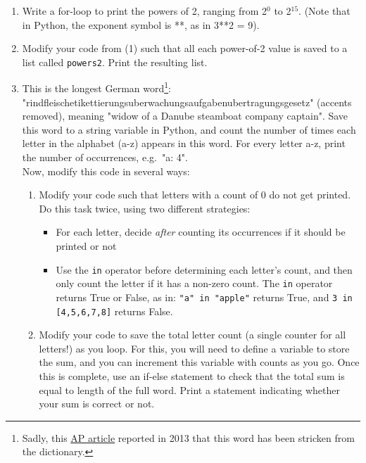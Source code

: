 \documentclass{article}[12pt]
\newcommand{\code}[1]{\texttt{#1}}  %
\begin{document}
\begin{enumerate}[itemsep=5ex]
	\item Write a for-loop to print the powers of 2, ranging from 2$^0$ to 2$^{15}$. (Note that in Python, the exponent symbol is **, as in 3**2 = 9). 
	
	\item Modify your code from (1) such that all each power-of-2 value is saved to a list called \code{powers2}. Print the resulting list. 

	
	\item This is the longest German word\footnote{Sadly, this \href{http://www.salon.com/2013/06/03/law_change_spells_end_for_germanys_longest_word_ap/}{AP article} reported in 2013 that this word has been stricken from the dictionary.}: "rindfleischetikettierungsuberwachungsaufgabenubertragungsgesetz" (accents removed), meaning "widow of a Danube steamboat company captain". Save this word to a string variable in Python, and count the number of times each letter in the alphabet (a-z) appears in this word. For every letter a-z, print the number of occurrences, e.g.\ "a: 4".
	\\ Now, modify this code in several ways:
	\begin{enumerate}[itemsep=2ex]
		\item Modify your code such that letters with a count of 0 do not get printed. Do this task twice, using two different strategies:
		\begin{itemize}
			\item For each letter, decide \emph{after} counting its occurrences if it should be printed or not
			\item Use the \code{in} operator before determining each letter's count, and then only count the letter if it has a non-zero count. The \code{in} operator returns True or False, as in: \code{"a" in "apple"} returns True, and \code{3 in [4,5,6,7,8]} returns False.
		\end{itemize}
		\item Modify your code to save the total letter count (a single counter for all letters!) as you loop. For this, you will need to define a variable to store the sum, and you can increment this variable with counts as you go. Once this is complete, use an if-else statement to check that the total sum is equal to length of the full word. Print a statement indicating whether your sum is correct or not.
	\end{enumerate}
	

\end{enumerate}
\end{document}
